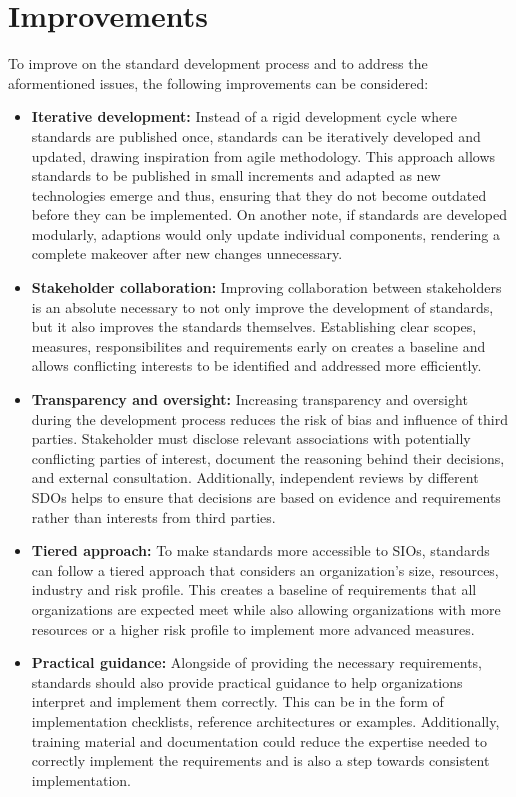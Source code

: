 \documentclass[12pt]{article}
\begin{document}
\section{Improvements}
To improve on the standard development process and to address the aformentioned issues, the following improvements can be considered:
\begin{itemize}
\item \textbf{Iterative development:} Instead of a rigid development cycle where standards are published once, standards can be iteratively developed and updated, drawing inspiration from agile methodology. This approach allows standards to be published in small increments and adapted as new technologies emerge and thus, ensuring that they do not become outdated before they can be implemented. On another note, if standards are developed modularly, adaptions would only update individual components, rendering a complete makeover after new changes unnecessary.
\item \textbf{Stakeholder collaboration:} Improving collaboration between stakeholders is an absolute necessary to not only improve the development of standards, but it also improves the standards themselves. Establishing clear scopes, measures, responsibilites and requirements early on creates a baseline and allows conflicting interests to be identified and addressed more efficiently.
\item \textbf{Transparency and oversight:} Increasing transparency and oversight during the development process reduces the risk of bias and influence of third parties. Stakeholder must disclose relevant associations with potentially conflicting parties of interest, document the reasoning behind their decisions, and external consultation. Additionally, independent reviews by different SDOs helps to ensure that decisions are based on evidence and requirements rather than interests from third parties.
\item \textbf{Tiered approach:} To make standards more accessible to SIOs, standards can follow a tiered approach that considers an organization's size, resources, industry and risk profile. This creates a baseline of requirements that all organizations are expected meet while also allowing organizations with more resources or a higher risk profile to implement more advanced measures. 
\item \textbf{Practical guidance:} Alongside of providing the necessary requirements, standards should also provide practical guidance to help organizations interpret and implement them correctly. This can be in the form of implementation checklists, reference architectures or examples. Additionally, training material and documentation could reduce the expertise needed to correctly implement the requirements and is also a step towards consistent implementation.
\end{itemize}
\end{document}
